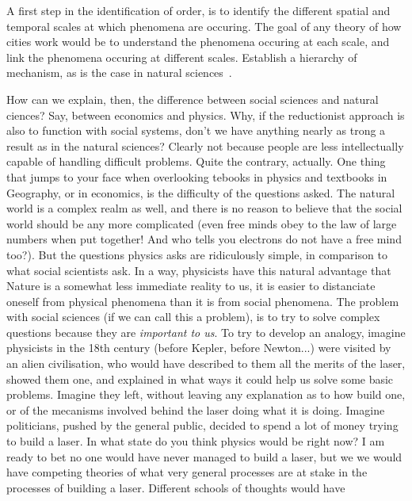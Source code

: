 A first step in the identification of order, is to identify the different
spatial and temporal scales at which phenomena are occuring. The goal of any
theory of how cities work would be to understand the phenomena occuring at each
scale, and link the phenomena occuring at different scales. Establish a
hierarchy of mechanism, as is the case in natural sciences~\cite{Simon:1962}.

How can we explain, then, the difference between social sciences and natural
ciences? Say, between economics and physics. Why, if the reductionist approach
is also to function with social systems, don't we have anything nearly as trong
a result as in the natural sciences? Clearly not because people are less
intellectually capable of handling difficult problems. Quite the
contrary, actually. One thing that jumps to your face when overlooking tebooks
in physics and textbooks in Geography, or in economics, is the difficulty of the
questions asked. The natural world is a complex realm as well, and there is no
reason to believe that the social world should be any more complicated (even
free minds obey to the law of large numbers when put together! And who tells you
electrons do not have a free mind too?). But the questions physics asks are
ridiculously simple, in comparison to what social scientists ask. In a way,
physicists have this natural advantage that Nature is a somewhat less immediate
reality to us, it is easier to distanciate oneself from physical phenomena than
it is from social phenomena. The problem with social sciences (if we can call
this a problem), is to try to solve complex questions because they are
\emph{important to us}. To try to develop an analogy, imagine physicists in the
18th century (before Kepler, before Newton...) were visited by an alien
civilisation, who would have described to them all the merits of the laser,
showed them one, and explained in what ways it could help us solve some basic
problems. Imagine they left, without leaving any explanation as to how build
one, or of the mecanisms involved behind the laser doing what it is doing.
Imagine politicians, pushed by the general public, decided to spend a lot of
money trying to build a laser. In what state do you think physics would be right
now? I am ready to bet no one would have never managed to build a laser, but we
we would have competing theories of what very general processes are at stake in
the processes of building a laser. Different schools of thoughts would have
